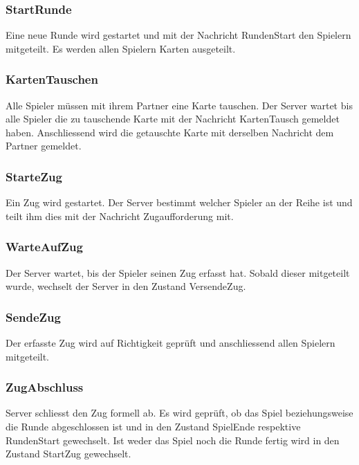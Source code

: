 \documentclass[12pt,halfparskip]{scrartcl}
\begin{document}

\subsubsection{StartRunde} %
\label{ssub:startrunde}
Eine neue Runde wird gestartet und mit der Nachricht RundenStart den Spielern mitgeteilt. Es werden allen Spielern Karten ausgeteilt.


\subsubsection{KartenTauschen} %
\label{ssub:kartentauschen}
Alle Spieler müssen mit ihrem Partner eine Karte tauschen. Der Server wartet bis alle Spieler die zu tauschende Karte mit der Nachricht KartenTausch gemeldet haben. Anschliessend wird die getauschte Karte mit derselben Nachricht dem Partner gemeldet.


\subsubsection{StarteZug} %
\label{ssub:startezug}
Ein Zug wird gestartet. Der Server bestimmt welcher Spieler an der Reihe ist und teilt ihm dies mit der Nachricht Zugaufforderung mit. 


\subsubsection{WarteAufZug} %
\label{ssub:warteaufzug}
Der Server wartet, bis der Spieler seinen Zug erfasst hat. Sobald dieser mitgeteilt wurde, wechselt der Server in den Zustand VersendeZug.

\subsubsection{SendeZug} %
\label{ssub:sendezug}
Der erfasste Zug wird auf Richtigkeit geprüft und anschliessend allen Spielern mitgeteilt.


\subsubsection{ZugAbschluss} %
\label{ssub:zugabschluss}
Server schliesst den Zug formell ab. Es wird geprüft, ob das Spiel beziehungsweise die Runde abgeschlossen ist und in den Zustand SpielEnde respektive RundenStart gewechselt. Ist weder das Spiel noch die Runde fertig wird in den Zustand StartZug gewechselt.
\end{document}

